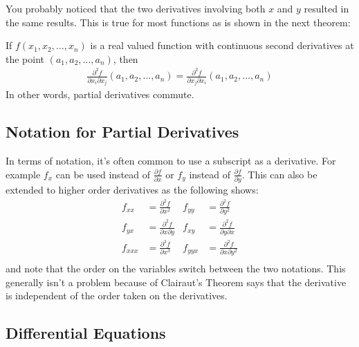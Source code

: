 You probably noticed that the two derivatives involving both $x$ and $y$ resulted in the same results.  This is true for most functions as is shown in the next theorem:
%
\begin{theorem}
If $f(x_1, x_2, \ldots, x_n)$ is a real valued function with continuous second derivatives at the point $(a_1, a_2, \ldots, a_n)$, then 
%
\begin{align*}
\frac{\partial^2 f}{\partial x_i \partial x_j}(a_1,a_2, \ldots, a_n) = \frac{\partial^2 f}{\partial x_j \partial x_i} (a_1,a_2,\ldots, a_n) 
\end{align*}
In other words, partial derivatives commute.  
\end{theorem}



\subsection{Notation for Partial Derivatives}

In terms of notation, it's often common to use a subscript as a derivative.  For example $f_x$ can be used instead of $\frac{\partial f}{\partial x}$ or $f_y$ instead of $\frac{\partial f}{\partial y}$.  This can also be extended to higher order derivatives as the following shows:
%
\begin{align*}
f_{xx} & = \frac{\partial^2 f}{\partial x^2} & f_{yy} & = \frac{\partial^2 f}{\partial y^2} \\
f_{yx} & = \frac{\partial^2 f}{\partial x \partial y} & f_{xy} & = \frac{\partial^2 f}{\partial y \partial x} \\
f_{xxx} & = \frac{\partial^3 f}{\partial x^3} & f_{yyx} & = \frac{\partial^2 f}{\partial x\partial y^2} \\
\end{align*}
%
and note that the order on the variables switch between the two notations.  This generally isn't a problem because of Clairaut's Theorem says that the derivative is independent of the order taken on the derivatives.  



\subsection{Differential Equations}  







